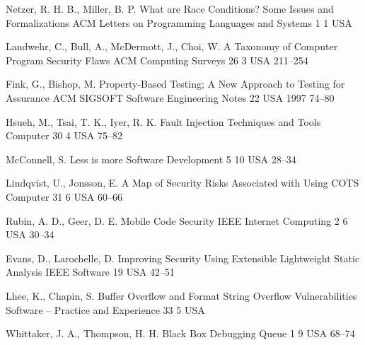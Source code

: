 \begin{thebibliography}{9}

		{Netzer, R. H. B., Miller, B. P.} %
		{What are Race Conditions? Some Issues and Formalizations}
		{ACM Letters on Programming Languages and Systems}
		{1}
		{1}
		{USA}
		{}
		{}
	
		{Landwehr, C., Bull, A., McDermott, J., Choi, W.} %
		{A Taxonomy of Computer Program Security Flaws}
		{ACM Computing Surveys}
		{26}
		{3}
		{USA}
		{}
		{211--254}
		
		{Fink, G., Bishop, M.} %
		{Property-Based Testing; A New Approach to Testing for Assurance}
		{ACM SIGSOFT Software Engineering Notes}
		{22}
		{}
		{USA}
		{1997}
		{74--80}
	
		{Hsueh, M., Tsai, T. K., Iyer, R. K.} %
		{Fault Injection Techniques and Tools}
		{Computer}
		{30}
		{4}
		{USA}
		{}
		{75--82}
	
		{McConnell, S.} %
		{Less is more}
		{Software Development}
		{5}
		{10}
		{USA}
		{}
		{28--34}
	
		{Lindqvist, U., Jonsson, E.} %
		{A Map of Security Risks Associated with Using {COTS}}
		{Computer}
		{31}
		{6}
		{USA}
		{}
		{60--66}
	
		{Rubin, A. D., Geer, D. E.} %
		{Mobile Code Security}
		{{IEEE} Internet Computing}
		{2}
		{6}
		{USA}
		{}
		{30--34}
	
		{Evans, D., Larochelle, D.} %
		{Improving Security Using Extensible Lightweight Static Analysis}
		{{IEEE} Software}
		{19}
		{}
		{USA}
		{}
		{42--51}
	
		{Lhee, K., Chapin, S.} %
		{Buffer Overflow and Format String Overflow Vulnerabilities}
		{Software -- Practice and Experience}
		{33}
		{5}
		{USA}
		{}
		{}
	
		{Whittaker, J. A., Thompson, H. H.} %
		{Black Box Debugging}
		{Queue}
		{1}
		{9}
		{USA}
		{}
		{68--74}
	

\end{thebibliography}

